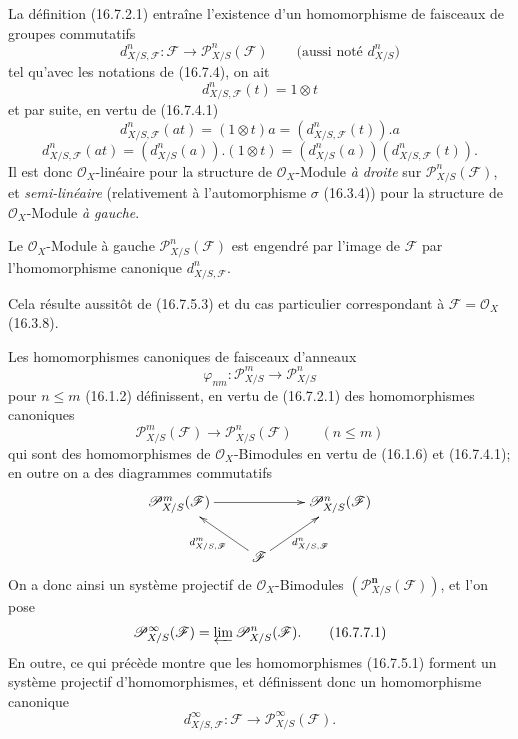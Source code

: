\begin{env}[16.7.5]
\label{IV.16.7.5}
La définition (16.7.2.1) entraîne l'existence d'un homomorphisme de faisceaux
de groupes commutatifs
\[
  d_{X/S,\mathscr{F}}^n:\mathscr{F}
  \longrightarrow\mathscr{P}_{X/S}^n(\mathscr{F})
  \qquad\text{(aussi noté $d_{X/S}^n$)}
  \tag{16.7.5.1}
  \label{IV.16.7.5.1}
\]
tel qu'avec les notations de (16.7.4), on ait
\[
  d_{X/S,\mathscr{F}}^n(t)=1\otimes t
  \tag{16.7.5.2}
  \label{IV.16.7.5.2}
\]
et par suite, en vertu de (16.7.4.1)
\[
  d_{X/S,\mathscr{F}}^n(at)
  =(1\otimes t)a=(d_{X/S,\mathscr{F}}^n(t)).a
  \tag{16.7.5.3}
  \label{IV.16.7.5.3}
\]
\[
  d_{X/S,\mathscr{F}}^n(at)
  =(d_{X/S}^n(a)).(1\otimes t)
  =(d_{X/S}^n(a))(d_{X/S,\mathscr{F}}^n(t)).
  \tag{16.7.5.4}
  \label{IV.16.7.5.4}
\]
Il est donc $\mathcal{O}_X$-linéaire pour la structure de
$\mathcal{O}_X$-Module \emph{à droite} sur $\mathscr{P}_{X/S}^n(\mathscr{F})$, et
\emph{semi-linéaire} (relativement à l'automorphisme $\sigma$ (16.3.4)) pour
la structure de $\mathcal{O}_X$-Module \emph{à gauche}.
\end{env}

\begin{proposition}[16.7.6]
\label{IV.16.7.6}
Le $\mathcal{O}_X$-Module à gauche $\mathscr{P}_{X/S}^n(\mathscr{F})$ est
engendré par l'image de $\mathscr{F}$ par l'homomorphisme canonique
$d_{X/S,\mathscr{F}}^n$.
\end{proposition}

Cela résulte aussitôt de (16.7.5.3) et du cas particulier correspondant à
$\mathscr{F}=\mathcal{O}_X$ (16.3.8).

\begin{env}[16.7.7]
\label{IV.16.7.7}
Les homomorphismes canoniques de faisceaux d'anneaux
\[
  \varphi_{nm}:\mathscr{P}_{X/S}^m\longrightarrow\mathscr{P}_{X/S}^n
\]
pour $n\leq m$ (16.1.2) définissent, en vertu de (16.7.2.1) des
homomorphismes canoniques
\[
  \mathscr{P}_{X/S}^m(\mathscr{F})
  \longrightarrow\mathscr{P}_{X/S}^n(\mathscr{F})\qquad(n\leq m)
\]
qui sont des homomorphismes de $\mathcal{O}_X$-Bimodules en vertu de (16.1.6)
et (16.7.4.1); en outre on a des diagrammes commutatifs
\[
  \xymatrix{
    \mathscr{P}_{X/S}^m(\mathscr{F})\ar[rr]
      &&\mathscr{P}_{X/S}^n(\mathscr{F})\\
    &\mathscr{F}\ar[ul]^-{d_{X/S,\mathscr{F}}^m}
      \ar[ur]_-{d_{X/S,\mathscr{F}}^n}
  }
\]
On a donc ainsi un système projectif de $\mathcal{O}_X$-Bimodules
$(\mathscr{P}_{X/S}^{\boldsymbol{n}}(\mathscr{F}))$, et l'on pose
\[
  \mathscr{P}_{X/S}^{\infty}(\mathscr{F})
  =\varprojlim\mathscr{P}_{X/S}^n(\mathscr{F}).
  \tag{16.7.7.1}
  \label{IV.16.7.7.1}
\]
En outre, ce qui précède montre que les homomorphismes (16.7.5.1) forment un
système projectif d'homomorphismes, et définissent donc un homomorphisme
canonique
\[
  d_{X/S,\mathscr{F}}^{\infty}:\mathscr{F}
  \longrightarrow\mathscr{P}_{X/S}^{\infty}(\mathscr{F}).
  \tag{16.7.7.2}
  \label{IV.16.7.7.2}
\]
\end{env}


